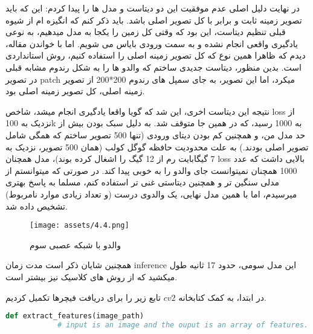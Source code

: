 \documentclass[a4paper,12pt]{article}
\begin{document}
در نهایت دلیل اصلی عدم موفقیت این دو دیتاست و مدل ها را پیدا کردم: این که باید تصویر زمینه ثابت و برابر با کل تصویر اصلی باشد. باید ذکر کنم که انگیزه ام از شیوه قبلی تنظیم دیتاست، این بود که وقتی کل زمین را یکجا به مدل میدهیم، به نوعی یادگیری واقعی انجام نشده و به سمت ورودی بایاس می شویم. اما با خواندن مقاله، دیدم که ظاهرا همین نوع که کل تصویر زمینه اصلی را استفاده کنیم، روش استانداردی است. بدین منظور، دیتاست جدیدی  ساختم که والدو ها را به شکل رندوم مشابه قبلی در تصویر patch میکرد، اما این تصویر، به جای سمپل های رندوم 200*200 از تصویر زمینه اصلی، کل تصویر زمینه اصلی بود.

نتیجه این دیتاست اخری، این شد که گویا واقعا یادگیری انجام میشد، شاخص loss از نزدیک به 100k به 1000 رسید، که در همین جا متوقف شد. به دلیل سبک بودن بیش از حد مدل من، و همچنین کم بودن دیتای ورودی (تنها 500 تصویر ساختم که همگی شامل تصویر اصلی بودند.) به علت محدودیت حافظه گوگل کولب (همان 500 تصویر، نزدیک به 7 گیگابایت رم از 12 گیگ را اشغال کرده بوند)، مدل همچنان loss بالایی داشت که عدد 1000 همچنان نمیتوانست جای والدو را به خوبی پیدا کند. در صورتی که میتوانستم از مدلی سنگین تر و همچنین دیتاستی غنی تر استفاده کنم، مسلما به پاسخ بهتری میرسیدم، اما با همین مدل نهایی، یک والدوی درست (و تعداد زیادی موارد نامربوط) تشخیص داده شد.

 \begin{figure}[h]
	\centering
	\texttt{[image: assets/4.4.png]}
	\caption{\textcolor{CustomAccent}{والدو با شبکه عصبی سوم}}
\end{figure}

همچنین شایان ذکر است مدت زمان inference این مدل سومی، حدود 17 ثانیه طول میکشید که از روش های کلاسیک نیز بیشتر است. 


	\pagebreak
	
	در ابتدا، به کمک کتابخانه 
	$cv2$
	تابع زیر را برای دریافت فیچرها تکمیل کردیم. 
	
	\begin{latin}
		\begin{lstlisting}[language=Python, caption={extract feature function}]
			def extract_features(image_path)
			# input is an image and the ouput is an array of features.
		\end{lstlisting}
	\end{latin}
	
	
\end{document}
